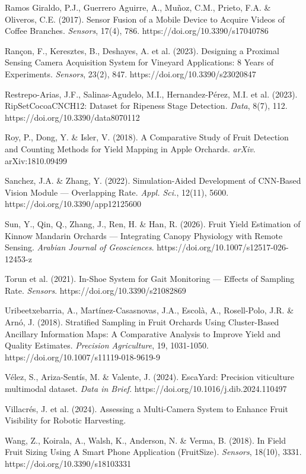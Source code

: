 Ramos Giraldo, P.J., Guerrero Aguirre, A., Muñoz, C.M., Prieto, F.A. \& Oliveros, C.E. (2017). Sensor Fusion of a Mobile Device to Acquire Videos of Coffee Branches. \textit{Sensors}, 17(4), 786. https://doi.org/10.3390/s17040786


Rançon, F., Keresztes, B., Deshayes, A. et al. (2023). Designing a Proximal Sensing Camera Acquisition System for Vineyard Applications: 8 Years of Experiments. \textit{Sensors}, 23(2), 847. https://doi.org/10.3390/s23020847


Restrepo-Arias, J.F., Salinas-Agudelo, M.I., Hernandez-Pérez, M.I. et al. (2023). RipSetCocoaCNCH12: Dataset for Ripeness Stage Detection. \textit{Data}, 8(7), 112. https://doi.org/10.3390/data8070112


Roy, P., Dong, Y. \& Isler, V. (2018). A Comparative Study of Fruit Detection and Counting Methods for Yield Mapping in Apple Orchards. \textit{arXiv}. arXiv:1810.09499


Sanchez, J.A. \& Zhang, Y. (2022). Simulation-Aided Development of CNN-Based Vision Module — Overlapping Rate. \textit{Appl. Sci.}, 12(11), 5600. https://doi.org/10.3390/app12125600


Sun, Y., Qin, Q., Zhang, J., Ren, H. \& Han, R. (2026). Fruit Yield Estimation of Kinnow Mandarin Orchards — Integrating Canopy Physiology with Remote Sensing. \textit{Arabian Journal of Geosciences}. https://doi.org/10.1007/s12517-026-12453-z


Torun et al. (2021). In-Shoe System for Gait Monitoring — Effects of Sampling Rate. \textit{Sensors}. https://doi.org/10.3390/s21082869


Uribeetxebarria, A., Martínez-Casasnovas, J.A., Escolà, A., Rosell-Polo, J.R. \& Arnó, J. (2018). Stratified Sampling in Fruit Orchards Using Cluster-Based Ancillary Information Maps: A Comparative Analysis to Improve Yield and Quality Estimates. \textit{Precision Agriculture}, 19, 1031-1050. https://doi.org/10.1007/s11119-018-9619-9


Vélez, S., Ariza-Sentís, M. \& Valente, J. (2024). EscaYard: Precision viticulture multimodal dataset. \textit{Data in Brief}. https://doi.org/10.1016/j.dib.2024.110497


Villacrés, J. et al. (2024). Assessing a Multi-Camera System to Enhance Fruit Visibility for Robotic Harvesting.


Wang, Z., Koirala, A., Walsh, K., Anderson, N. \& Verma, B. (2018). In Field Fruit Sizing Using A Smart Phone Application (FruitSize). \textit{Sensors}, 18(10), 3331. https://doi.org/10.3390/s18103331


